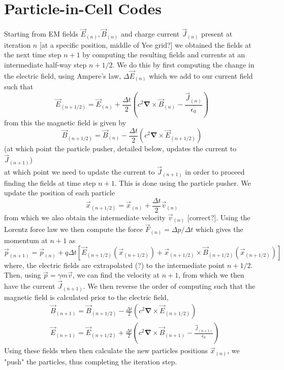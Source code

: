 \section{Particle-in-Cell Codes}
\label{sec:Particle-in-Cell Codes}
Starting from EM fields $\vec{E}_{(n)},\vec{B}_{(n)}$ and charge current $\vec{J}_{(n)}$ present at iteration $n$ [at a specific position, middle of Yee grid?] we obtained the fields at the next time step $n+1$ by computing the resulting fields and currents at an intermediate half-way step $n+1/2$. We do this by first computing the change in the electric field, using Ampere's law, $\Delta \vec{E}_{(n)}$ which we add to our current field such that
\begin{equation}
\vec{E}_{(n+1/2)}=\vec{E}_{(n)}+\frac{\Delta t}{2}\left(c^2\mathbf{\nabla}\times \vec{B}_{(n)}-\frac{\vec{J}_{(n)}}{\epsilon_0}\right)
\end{equation}
from this the magnetic field is given by
\begin{equation}
\vec{B}_{(n+1/2)}=\vec{B}_{(n)}-\frac{\Delta t}{2}\left(c^2\mathbf{\nabla}\times \vec{E}_{(n+1/2)}\right)
\end{equation}
(at which point the particle pusher, detailed below, updates the current to $\vec{J}_{(n+1)}$)\\
at which point we need to update the current to $\vec{J}_{(n+1)}$ in order to proceed finding the fields at time step $n+1$. This is done using the particle pusher. We update the position of each particle 
\begin{equation}
\vec{x}_{(n+1/2)}=\vec{x}_{(n)}+\frac{\Delta t}{2}\vec{v}_{(n)}
\end{equation}
from which we also obtain the intermediate velocity $\vec{v}_{(n)}$ [correct?]. Using the Lorentz force law we then compute the force $\vec{F}_{(n)}=\Delta p/\Delta t$ which gives the momentum at $n+1$ as
\begin{equation}
\vec{p}_{(n+1)}=\vec{p}_{(n)}+q\Delta t\left[\vec{E}_{(n+1/2)}\left(\vec{x}_{(n+1/2)}\right)+\vec{x}_{(n+1/2)}\times\vec{B}_{(n+1/2)}\left(\vec{x}_{(n+1/2)}\right) \right]
\end{equation}
where, the electric fields are extrapolated (?) to the intermediate point $n+1/2$. Then, using $\vec{p}=\gamma m \vec{v}$, we can find the velocity at $n+1$, from which we then have the current $\vec{J}_{(n+1)}$. We then reverse the order of computing such that the magnetic field is calculated prior to the electric field,
\begin{align}
&\vec{B}_{(n+1)}=\vec{B}_{(n+1/2)}-\frac{\Delta t}{2}\left(c^2\mathbf{\nabla}\times \vec{E}_{(n+1/2)}\right)\\
&\vec{E}_{(n+1)}=\vec{E}_{(n+1/2)}+\frac{\Delta t}{2}\left(c^2\mathbf{\nabla}\times \vec{B}_{(n+1)}-\frac{\vec{J}_{(n+1)}}{\epsilon_0}\right)
\end{align}
Using these fields when then calculate the new particles positions $\vec{x}_{(n)}$, we "push" the particles, thus completing the iteration step.

